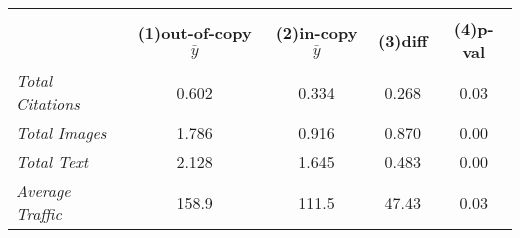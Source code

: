 {
\def\sym#1{\ifmmode^{#1}\else\(^{#1}\)\fi}
\begin{tabular}{l*{1}{cccc}}
\toprule
                    &\multicolumn{4}{c}{}                               \\
                    &\textbf{(1)out-of-copy $\bar{y}$}&\textbf{(2)in-copy $\bar{y}$}&\textbf{(3)diff}&\textbf{(4)p-val}\\
\midrule
\emph{Total Citations}&       0.602&       0.334&       0.268&        0.03\\
\emph{Total Images} &       1.786&       0.916&       0.870&        0.00\\
\emph{Total Text}   &       2.128&       1.645&       0.483&        0.00\\
\emph{Average Traffic}&       158.9&       111.5&       47.43&        0.03\\
\bottomrule
\end{tabular}
}
